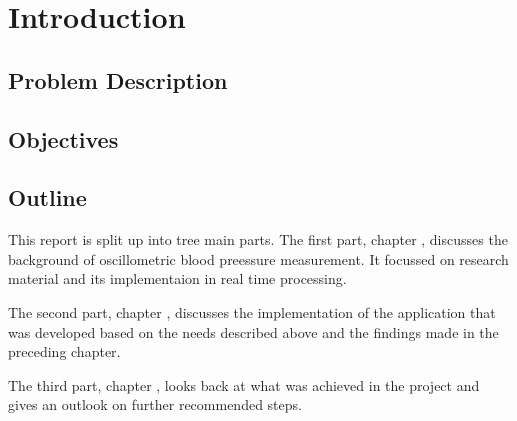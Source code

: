 \chapter{Introduction}\label{cp:Intro}

\section{Problem Description}



\section{Objectives}



\section{Outline}
This report is split up into tree main parts. The first part, chapter , discusses the background of oscillometric blood preessure measurement. It focussed on research material and its implementaion in real time processing. 

The second part, chapter , discusses the implementation of the application that was developed based on the needs described above and the findings made in the preceding chapter.

The third part, chapter , looks back at what was achieved in the project and gives an outlook on further recommended steps.